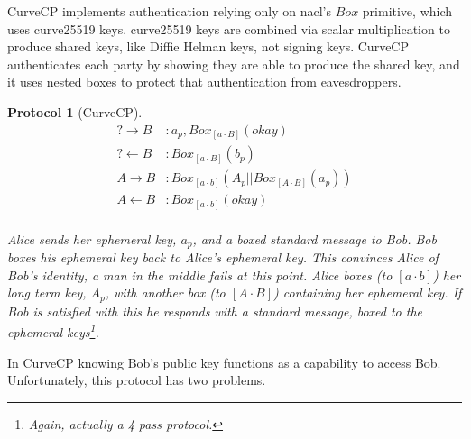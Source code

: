\documentclass[12pt]{article}
\newtheorem{proto}{Protocol}
\begin{document}
CurveCP\cite{curvecp} implements authentication relying only on
nacl's\cite{nacl} $Box$ primitive, which uses curve25519 keys.
curve25519 keys are combined via scalar multiplication to produce
shared keys, like Diffie Helman keys\cite{ndic}, not signing keys.
CurveCP authenticates each party by showing they are able to produce
the shared key, and it uses nested boxes to protect that authentication
from eavesdroppers.

\begin{proto}[CurveCP]

  $$
  \begin{align*}
      ? \to B   &: a_{p}, Box_{[a\cdot B]}(okay) \\
      ? \gets B &: Box_{[a\cdot B]}(b_{p}) \\
      A \to B   &: Box_{[a\cdot b]}(A_p||Box_{[A \cdot B]}(a_{p}))\\
      A \gets B &: Box_{[a\cdot b]}(okay) \\
  \end{align*}
  $$

  Alice sends her ephemeral key, $a_p$, and a boxed standard message to Bob.
  Bob boxes his ephemeral key back to Alice's ephemeral key.
  This convinces Alice of Bob's identity, a man in the middle fails
  at this point. Alice boxes (to $[a\cdot b]$) her long term key, $A_p$,
  with another box (to $[A\cdot B]$) containing her ephemeral key.
  If Bob is satisfied with this he responds with a standard message,
  boxed to the ephemeral keys\footnote{
    Again, actually a 4 pass protocol.
  }.

\end{proto}

In CurveCP knowing Bob's public key functions as a capability
to access Bob. Unfortunately, this protocol has two problems.
\end{document}
